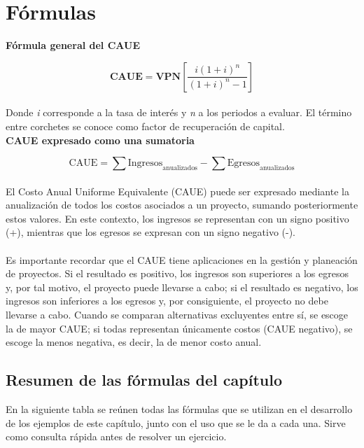 \newpage
\section{Fórmulas}
\textbf{Fórmula general del CAUE}\newline

\begin{equation*}
	\textbf{CAUE} = \textbf{VPN}\left[ \frac{i(1+i)^n}{(1+i)^n-1}\right]
\end{equation*}
\\
Donde \textit{i} corresponde a la tasa de interés y \textit{n} a los periodos a evaluar. El término entre corchetes se conoce como factor de recuperación de capital.
\\

\textbf{CAUE expresado como una sumatoria}\newline

\begin{equation*}
	\text{CAUE} = \sum \text{Ingresos}_{\text{anualizados}} - \sum \text{Egresos}_{\text{anualizados}}
\end{equation*}
\\
El Costo Anual Uniforme Equivalente (CAUE) puede ser expresado mediante la anualización de todos los costos asociados a un proyecto, sumando posteriormente estos valores. En este contexto, los ingresos se representan con un signo positivo (+), mientras que los egresos se expresan con un signo negativo (-).
\\\\
Es importante recordar que el CAUE tiene aplicaciones en la gestión y planeación de proyectos. Si el resultado es positivo, los ingresos son superiores a los egresos y, por tal motivo, el proyecto puede llevarse a cabo; si el resultado es negativo, los ingresos son inferiores a los egresos y, por consiguiente, el proyecto no debe llevarse a cabo. Cuando se comparan alternativas excluyentes entre sí, se escoge la de mayor CAUE; si todas representan únicamente costos (CAUE negativo), se escoge la menos negativa, es decir, la de menor costo anual.


\subsection{Resumen de las fórmulas del capítulo}

En la siguiente tabla se reúnen todas las fórmulas que se utilizan en el desarrollo de los ejemplos de este capítulo, junto con el uso que se le da a cada una. Sirve como consulta rápida antes de resolver un ejercicio.

